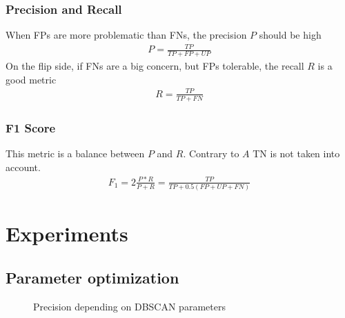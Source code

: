 \documentclass[letterpaper,10pt,english]{sphinxmanual}
\begin{document}
\subsection{Precision and Recall}
\label{\detokenize{NBodySimulation/Clustering:precision-and-recall}}
\sphinxAtStartPar
When FPs are more problematic than FNs, the precision \(P\) should be high
\begin{equation*}
\begin{split}P = \frac{TP}{TP+FP+UP}\end{split}
\end{equation*}
\sphinxAtStartPar
On the flip side, if FNs are a big concern, but FPs tolerable, the recall \(R\) is a good metric
\begin{equation*}
\begin{split}R = \frac{TP}{TP+FN}\end{split}
\end{equation*}

\subsection{F1 Score}
\label{\detokenize{NBodySimulation/Clustering:f1-score}}
\sphinxAtStartPar
This metric is a balance between \(P\) and \(R\). Contrary to \(A\) TN is not taken into account.
\begin{equation*}
\begin{split}F_1 = 2 \frac{P*R}{P+R} = \frac{TP}{TP+0.5(FP+UP+FN)}\end{split}
\end{equation*}

\chapter{Experiments}
\label{\detokenize{NBodySimulation/Experiments:experiments}}\label{\detokenize{NBodySimulation/Experiments::doc}}

\section{Parameter optimization}
\label{\detokenize{NBodySimulation/Experiments:parameter-optimization}}
\begin{figure}[htbp]
\centering
\capstart

\noindent{}
\caption{Precision depending on DBSCAN parameters}\label{\detokenize{NBodySimulation/Experiments:id2}}\label{\detokenize{NBodySimulation/Experiments:fig-dbscan}}\end{figure}
\end{document}
